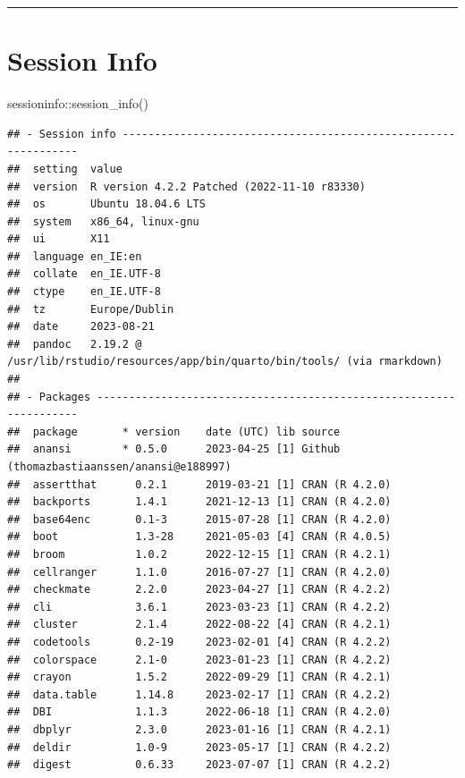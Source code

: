 \documentclass[
]{article}
\newenvironment{Shaded}{\begin{snugshade}}{\end{snugshade}}
\newcommand{\FunctionTok}[1]{\textcolor[rgb]{0.00,0.00,0.00}{#1}}
\newcommand{\NormalTok}[1]{#1}
\newcommand{\SpecialCharTok}[1]{\textcolor[rgb]{0.00,0.00,0.00}{#1}}
\begin{document}
\begin{center}\rule{0.5\linewidth}{0.5pt}\end{center}

\newpage

\hypertarget{session-info}{%
\section{Session Info}\label{session-info}}

\begin{Shaded}
\begin{Highlighting}[]
\NormalTok{sessioninfo}\SpecialCharTok{::}\FunctionTok{session\_info}\NormalTok{()}
\end{Highlighting}
\end{Shaded}

\begin{verbatim}
## - Session info ---------------------------------------------------------------
##  setting  value
##  version  R version 4.2.2 Patched (2022-11-10 r83330)
##  os       Ubuntu 18.04.6 LTS
##  system   x86_64, linux-gnu
##  ui       X11
##  language en_IE:en
##  collate  en_IE.UTF-8
##  ctype    en_IE.UTF-8
##  tz       Europe/Dublin
##  date     2023-08-21
##  pandoc   2.19.2 @ /usr/lib/rstudio/resources/app/bin/quarto/bin/tools/ (via rmarkdown)
## 
## - Packages -------------------------------------------------------------------
##  package       * version    date (UTC) lib source
##  anansi        * 0.5.0      2023-04-25 [1] Github (thomazbastiaanssen/anansi@e188997)
##  assertthat      0.2.1      2019-03-21 [1] CRAN (R 4.2.0)
##  backports       1.4.1      2021-12-13 [1] CRAN (R 4.2.0)
##  base64enc       0.1-3      2015-07-28 [1] CRAN (R 4.2.0)
##  boot            1.3-28     2021-05-03 [4] CRAN (R 4.0.5)
##  broom           1.0.2      2022-12-15 [1] CRAN (R 4.2.1)
##  cellranger      1.1.0      2016-07-27 [1] CRAN (R 4.2.0)
##  checkmate       2.2.0      2023-04-27 [1] CRAN (R 4.2.2)
##  cli             3.6.1      2023-03-23 [1] CRAN (R 4.2.2)
##  cluster         2.1.4      2022-08-22 [4] CRAN (R 4.2.1)
##  codetools       0.2-19     2023-02-01 [4] CRAN (R 4.2.2)
##  colorspace      2.1-0      2023-01-23 [1] CRAN (R 4.2.2)
##  crayon          1.5.2      2022-09-29 [1] CRAN (R 4.2.1)
##  data.table      1.14.8     2023-02-17 [1] CRAN (R 4.2.2)
##  DBI             1.1.3      2022-06-18 [1] CRAN (R 4.2.0)
##  dbplyr          2.3.0      2023-01-16 [1] CRAN (R 4.2.1)
##  deldir          1.0-9      2023-05-17 [1] CRAN (R 4.2.2)
##  digest          0.6.33     2023-07-07 [1] CRAN (R 4.2.2)

\end{verbatim}
\end{document}
